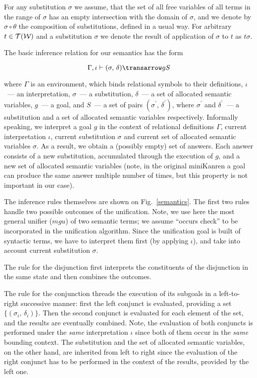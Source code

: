 For any substitution $\sigma$ we assume, that the set of all free variables of all terms in the range of $\sigma$ has an empty intersection with the
domain of $\sigma$, and we denote by $\sigma\circ\theta$ the composition of substitutions, defined in a usual way. For arbitrary $t\in{\mathcal{T}}({\mathcal{W}})$ and
a substitution $\sigma$ we denote the result of application of $\sigma$ to $t$ as $t\sigma$.

The basic inference relation for our semantics has the form

$$
\otrans{\Gamma,\iota}{(\sigma,\,\delta)}{g}{S}
$$

\noindent where $\Gamma$ is an environment, which binds relational symbols to their definitions, $\iota$~--- an interpretation, $\sigma$~--- a substitution, 
$\delta$~--- a set of allocated semantic variables, $g$~--- a goal, and $S$~--- a set of pairs $(\sigma^\prime,\,\delta^\prime)$, where $\sigma^\prime$ and
$\delta^\prime$~--- a substitution and a set of allocated semantic variables respectively. Informally speaking, we interpret a goal $g$ in the context of
relational definitions $\Gamma$, current interpretation $\iota$, current substitution $\sigma$ and current set of allocated semantic variables $\sigma$. As a 
result, we obtain a (possibly empty) set of answers. Each answer consists of a new substitution, accumulated through the execution of $g$, and a new set of
allocated semantic variables (note, in the original miniKanren a goal can produce the same answer multiple number of times, but this property is not important
in our case).

The inference rules themselves are shown on Fig.~\ref{semantics}. The first two rules handle two possible outcomes of the unification. Note, we use here the most 
general unifier ($mgu$) of two semantic terms; we assume ``occurs check'' to be incorporated in the unification algorithm. Since the unification goal is built of 
syntactic terms, we have to interpret them first (by applying $\iota$), and take into account current substitution $\sigma$.

The rule for the disjunction first interprets the constituents of the disjunction in the same state and then combines the outcomes.

The rule for the conjunction threads the execution of its subgoals in a left-to-right successive manner: first the
left conjunct is evaluated, providing a set $\{(\sigma_i,\,\delta_i)\}$. Then the second conjunct is evaluated for each element of the set, and the
results are eventually combined. Note, the evaluation of both conjuncts is performed under the \emph{same} interpretation $\iota$ since both of them occur in the 
\emph{same} bounding context. The substitution and the set of allocated semantic variables, on the other hand, are inherited from left to right since the evaluation 
of the right conjunct has to be performed in the context of the results, provided by the left one. 

